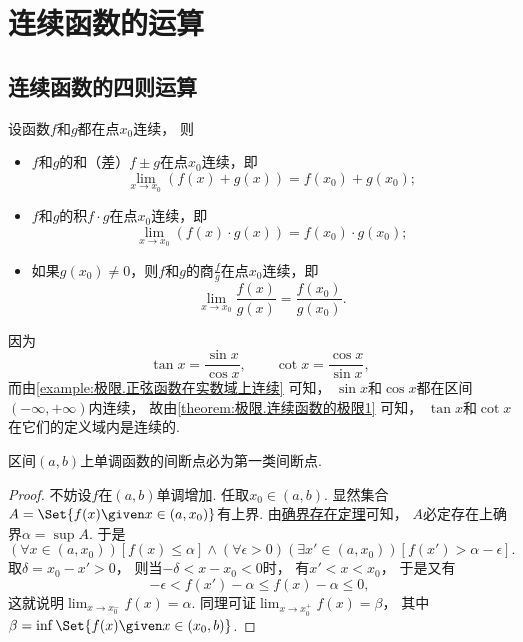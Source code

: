 \section{连续函数的运算}
\subsection{连续函数的四则运算}
\begin{theorem}\label{theorem:极限.连续函数的极限1}
设函数\(f\)和\(g\)都在点\(x_0\)连续，
则\begin{itemize}
	\item \(f\)和\(g\)的和（差）\(f \pm g\)在点\(x_0\)连续，即\[
		\lim_{x \to x_0} (f(x) + g(x))
		= f(x_0) + g(x_0);
	\]
	\item \(f\)和\(g\)的积\(f \cdot g\)在点\(x_0\)连续，即\[
		\lim_{x \to x_0} (f(x) \cdot g(x))
		= f(x_0) \cdot g(x_0);
	\]
	\item 如果\(g(x_0)\neq0\)，则\(f\)和\(g\)的商\(\frac{f}{g}\)在点\(x_0\)连续，即\[
		\lim_{x \to x_0} \frac{f(x)}{g(x)}
		= \frac{f(x_0)}{g(x_0)}.
	\]
\end{itemize}
\end{theorem}

\begin{example}
因为\[
	\tan x=\frac{\sin x}{\cos x}, \qquad
	\cot x=\frac{\cos x}{\sin x},
\]
而由\cref{example:极限.正弦函数在实数域上连续} 可知，
\(\sin x\)和\(\cos x\)都在区间\((-\infty,+\infty)\)内连续，
故由\cref{theorem:极限.连续函数的极限1} 可知，
\(\tan x\)和\(\cot x\)在它们的定义域内是连续的.
\end{example}

\begin{example}\label{example:连续函数的运算.开区间上的单调函数的间断点必为第一类间断点}
区间\((a,b)\)上单调函数的间断点必为第一类间断点.
\begin{proof}
不妨设\(f\)在\((a,b)\)单调增加.
任取\(x_0\in(a,b)\).
显然集合\(A=\Set{ f(x) \given x\in(a,x_0) }\)有上界.
由\hyperref[theorem:实数.确界原理]{确界存在定理}可知，
\(A\)必定存在上确界\(\alpha=\sup A\).
于是\[
	(\forall x\in(a,x_0))
	[f(x)\leq\alpha]
	\land
	(\forall\epsilon>0)
	(\exists x'\in(a,x_0))
	[f(x')>\alpha-\epsilon].
\]
取\(\delta=x_0-x'>0\)，
则当\(-\delta<x-x_0<0\)时，
有\(x'<x<x_0\)，
于是又有\[
	-\epsilon
	< f(x') - \alpha
	\leq f(x) - \alpha
	\leq 0,
\]
这就说明\(\lim_{x \to x_0^-} f(x) = \alpha\).
同理可证\(\lim_{x \to x_0^+} f(x) = \beta\)，
其中\(\beta=\inf\Set{ f(x) \given x\in(x_0,b) }\).
\end{proof}
\end{example}

